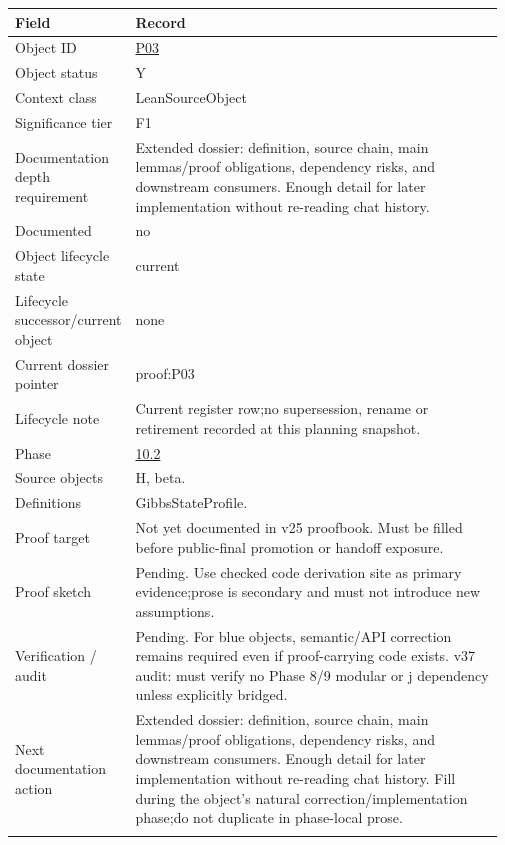 \begin{longtable}{L{0.16\linewidth} L{0.81\linewidth}}
\hline
\textbf{Field} & \textbf{Record}\\
\hline
Object ID & \hyperlink{object-row-P03}{P03}\\
\hline\addlinespace[0.20em]
Object status & Y\\
\hline\addlinespace[0.20em]
Context class & LeanSourceObject\\
\hline\addlinespace[0.20em]
Significance tier & F1\\
\hline\addlinespace[0.20em]
Documentation depth requirement & Extended dossier: definition, source chain, main lemmas/\allowbreak{}proof obligations, dependency risks, and downstream consumers. Enough detail for later implementation without re-reading chat history.\\
\hline\addlinespace[0.20em]
Documented & no\\
\hline\addlinespace[0.20em]
Object lifecycle state & current\\
\hline\addlinespace[0.20em]
Lifecycle successor/\allowbreak{}current object & none\\
\hline\addlinespace[0.20em]
Current dossier pointer & proof:P03\\
\hline\addlinespace[0.20em]
Lifecycle note & Current register row;\newline no supersession, rename or retirement recorded at this planning snapshot.\\
\hline\addlinespace[0.20em]
Phase & \hyperlink{phase-row-10-2}{10.2}\\
\hline\addlinespace[0.20em]
Source objects & H, beta.\\
\hline\addlinespace[0.20em]
Definitions & GibbsStateProfile.\\
\hline\addlinespace[0.20em]
Proof target & Not yet documented in v25 proofbook. Must be filled before public-final promotion or handoff exposure.\\
\hline\addlinespace[0.20em]
Proof sketch & Pending. Use checked code derivation site as primary evidence;\newline prose is secondary and must not introduce new assumptions.\\
\hline\addlinespace[0.20em]
Verification /\allowbreak{} audit & Pending. For blue objects, semantic/\allowbreak{}API correction remains required even if proof-carrying code exists. v37 audit: must verify no Phase 8/\allowbreak{}9 modular or j dependency unless explicitly bridged.\\
\hline\addlinespace[0.20em]
Next documentation action & Extended dossier: definition, source chain, main lemmas/\allowbreak{}proof obligations, dependency risks, and downstream consumers. Enough detail for later implementation without re-reading chat history. Fill during the object's natural correction/\allowbreak{}implementation phase;\newline do not duplicate in phase-local prose.\\
\hline\addlinespace[0.20em]
\end{longtable}
